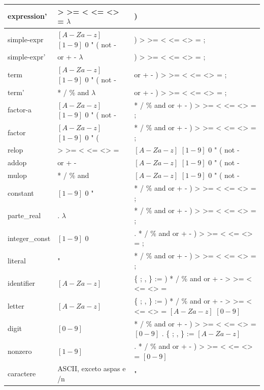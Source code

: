 \documentclass[12pt,a4paper]{article}
\begin{document}
\begin{longtable}{|l|p{6cm}|p{6cm}|}
expression'     & > >= < <= <> = $\lambda$                 & ) \\ \hline
simple-expr     & $[A-Za-z]$ $[1-9]$ 0 " ( not -          & ) > >= < <= <> = ; \\ \hline
simple-expr'    & or + - $\lambda$                         & ) > >= < <= <> = ; \\ \hline
term            & $[A-Za-z]$ $[1-9]$ 0 " ( not -          & or + - ) > >= < <= <> = ; \\ \hline
term'           & * / \% and $\lambda$                     & or + - ) > >= < <= <> = ; \\ \hline
factor-a        & $[A-Za-z]$ $[1-9]$ 0 " ( not -          & * / \% and or + - ) > >= < <= <> = ; \\ \hline
factor          & $[A-Za-z]$ $[1-9]$ 0 " (                & * / \% and or + - ) > >= < <= <> = ; \\ \hline
relop           & > >= < <= <> =                           & $[A-Za-z]$ $[1-9]$ 0 " ( not - \\ \hline
addop           & or + -                                   & $[A-Za-z]$ $[1-9]$ 0 " ( not - \\ \hline
mulop           & * / \% and                               & $[A-Za-z]$ $[1-9]$ 0 " ( not - \\ \hline
constant        & $[1-9]$ 0 "                              & * / \% and or + - ) > >= < <= <> = ; \\ \hline
parte\_real     & . $\lambda$                              & * / \% and or + - ) > >= < <= <> = ; \\ \hline
integer\_const  & $[1-9]$ 0                                & . * / \% and or + - ) > >= < <= <> = ; \\ \hline
literal         & "                                        & * / \% and or + - ) > >= < <= <> = ; \\ \hline
identifier      & $[A-Za-z]$                              & \{ ; , \} := ) * / \% and or + - > >= < <= <> = \\ \hline
letter          & $[A-Za-z]$                              & \{ ; , \} := ) * / \% and or + - > >= < <= <> = $[A-Za-z]$ $[0-9]$ \\ \hline
digit           & $[0-9]$                                 & * / \% and or + - ) > >= < <= <> = $[0-9]$ . \{ ; , \} := $[A-Za-z]$ \\ \hline
nonzero         & $[1-9]$                                 & . * / \% and or + - ) > >= < <= <> = $[0-9]$ \\ \hline
caractere       & ASCII, exceto aspas e /n                & " \\ \hline
\end{longtable}
\endgroup
\end{document}

